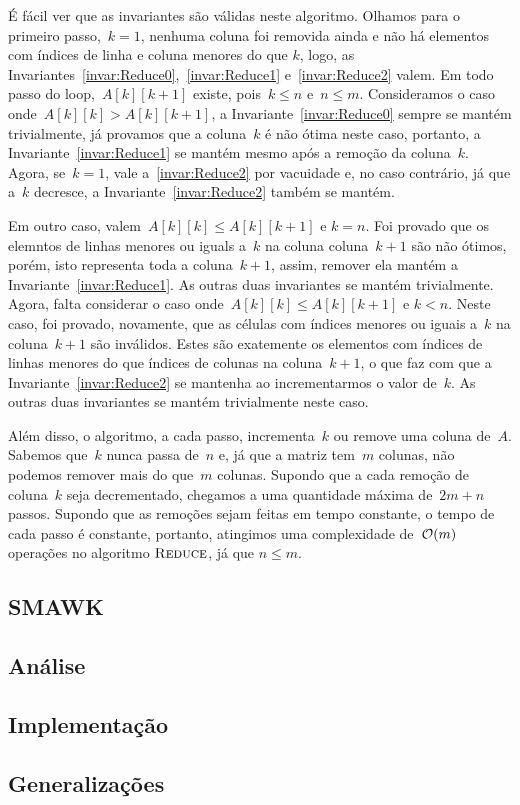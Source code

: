 É fácil ver que as invariantes são válidas neste algoritmo. Olhamos para o primeiro passo,~$k = 1$, nenhuma coluna foi removida ainda e não há elementos com índices de linha e coluna menores do que $k$, logo, as Invariantes~\ref{invar:Reduce0},~\ref{invar:Reduce1} e~\ref{invar:Reduce2} valem. Em todo passo do loop,~$A[k][k+1]$ existe, pois~$k \leq n$ e~$n \leq m$. Consideramos o caso onde~$A[k][k] > A[k][k+1]$, a Invariante~\ref{invar:Reduce0} sempre se mantém trivialmente, já provamos que a coluna~$k$ é não ótima neste caso, portanto, a Invariante~\ref{invar:Reduce1} se mantém mesmo após a remoção da coluna~$k$. Agora, se~$k=1$, vale a~\ref{invar:Reduce2} por vacuidade e, no caso contrário, já que a~$k$ decresce, a Invariante~\ref{invar:Reduce2} também se mantém. 

Em outro caso, valem~$A[k][k] \leq A[k][k+1]$ e $k = n$. Foi provado que os elemntos de linhas menores ou iguals a~$k$ na coluna coluna~$k+1$ são não ótimos, porém, isto representa toda a coluna~$k+1$, assim, remover ela mantém a Invariante~\ref{invar:Reduce1}. As outras duas invariantes se mantém trivialmente. Agora, falta considerar o caso onde~$A[k][k] \leq A[k][k+1]$ e $k < n$. Neste caso, foi provado, novamente, que as células com índices menores ou iguais a~$k$ na coluna~$k+1$ são inválidos. Estes são exatemente os elementos com índices de linhas menores do que índices de colunas na coluna~$k+1$, o que faz com que a Invariante~\ref{invar:Reduce2} se mantenha ao incrementarmos o valor de~$k$. As outras duas invariantes se mantém trivialmente neste caso.

Além disso, o algoritmo, a cada passo, incrementa~$k$ ou remove uma coluna de~$A$. Sabemos que~$k$ nunca passa de~$n$ e, já que a matriz tem~$m$ colunas, não podemos remover mais do que~$m$ colunas. Supondo que a cada remoção de coluna~$k$ seja decrementado, chegamos a uma quantidade máxima de~$2m + n$ passos. Supondo que as remoções sejam feitas em tempo constante, o tempo de cada passo é constante, portanto, atingimos uma complexidade de~$\mathcal{O}(m)$ operações no algoritmo $\textsc{Reduce}$, já que $n \leq m$.


\subsection{SMAWK}

\subsection{Análise}

\subsection{Implementação}

\subsection{Generalizações} \label{SMAWK_Generalizacoes}
